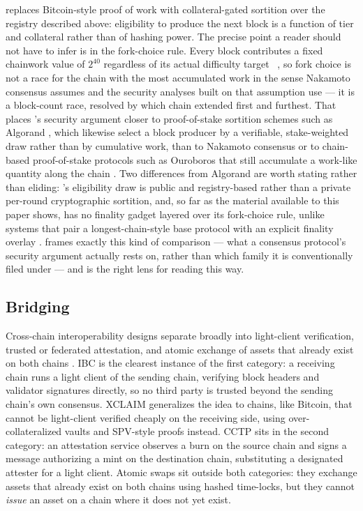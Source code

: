 \PoN replaces Bitcoin-style proof of work \citep{nakamoto2008bitcoin} with collateral-gated sortition
over the \FluxNode registry described above: eligibility to produce the next block is a function of
tier and collateral rather than of hashing power. The precise point a reader should not have to infer
is in the fork-choice rule. Every \PoN block contributes a fixed chainwork value of $2^{40}$ regardless
of its actual difficulty target \shipped\ , so fork choice is not a
race for the chain with the most accumulated work in the sense Nakamoto consensus assumes
\citep{nakamoto2008bitcoin} and the security analyses built on that assumption use
\citep{gervais2016security,eyal2014majority} — it is a block-count race, resolved by which chain
extended first and furthest. That places \PoN's security argument closer to proof-of-stake sortition
schemes such as Algorand \citep{gilad2017algorand}, which likewise select a block producer by a
verifiable, stake-weighted draw rather than by cumulative work, than to Nakamoto consensus or to
chain-based proof-of-stake protocols such as Ouroboros \citep{kiayias2017ouroboros} that still
accumulate a work-like quantity along the chain \srcinferred. Two differences from Algorand are worth
stating rather than eliding: \PoN's eligibility draw is public and registry-based rather than a private
per-round cryptographic sortition, and, so far as the material available to this paper shows, \PoN has
no finality gadget layered over its fork-choice rule, unlike systems that pair a longest-chain-style
base protocol with an explicit finality overlay \citep{buterin2017casper} \srcinferred.
\citep{bonneau2015sok} frames exactly this kind of comparison — what a consensus protocol's security
argument actually rests on, rather than which family it is conventionally filed under — and is the
right lens for reading \PoN this way.

\subsection{Bridging}

Cross-chain interoperability designs separate broadly into light-client verification, trusted or
federated attestation, and atomic exchange of assets that already exist on both chains
\citep{zamyatin2021sok}. IBC \citep{cosmosibc} is the clearest instance of the first category: a
receiving chain runs a light client of the sending chain, verifying block headers and validator
signatures directly, so no third party is trusted beyond the sending chain's own consensus. XCLAIM
\citep{zamyatin2019xclaim} generalizes the idea to chains, like Bitcoin, that cannot be light-client
verified cheaply on the receiving side, using over-collateralized vaults and SPV-style proofs instead.
CCTP \citep{cctp} sits in the second category: an attestation service observes a burn on the source
chain and signs a message authorizing a mint on the destination chain, substituting a designated
attester for a light client. Atomic swaps \citep{herlihy2018atomic} sit outside both categories: they
exchange assets that already exist on both chains using hashed time-locks, but they cannot
\emph{issue} an asset on a chain where it does not yet exist.

